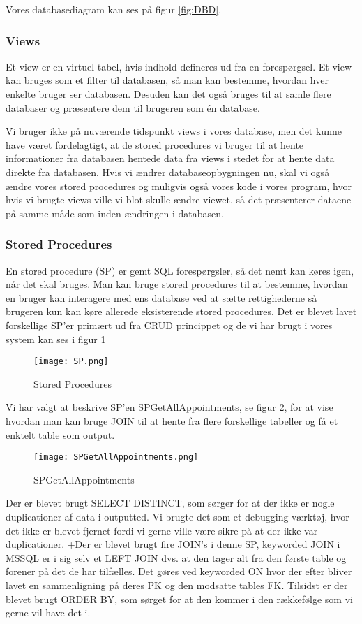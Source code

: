 Vores databasediagram kan ses på figur \ref{fig:DBD}.

\subsubsection{Views}

Et view er en virtuel tabel, hvis indhold defineres ud fra en forespørgsel.
Et view kan bruges som et filter til databasen, så man kan bestemme, hvordan hver enkelte bruger ser databasen.
Desuden kan det også bruges til at samle flere databaser og præsentere dem til brugeren som én database.

Vi bruger ikke på nuværende tidspunkt views i vores database, men det kunne have været fordelagtigt, at de stored procedures vi bruger til at hente informationer fra databasen hentede data fra views i stedet for at hente data direkte fra databasen.
Hvis vi ændrer databaseopbygningen nu, skal vi også ændre vores stored procedures og muligvis også vores kode i vores program, hvor hvis vi brugte views ville vi blot skulle ændre viewet, så det præsenterer dataene på samme måde som inden ændringen i databasen.

\subsubsection{Stored Procedures}
En stored procedure (SP) er gemt SQL forespørgsler, så det nemt kan køres igen, når det skal bruges.
Man kan bruge stored procedures til at bestemme, hvordan en bruger kan interagere med ens database ved at sætte rettighederne så brugeren kun kan køre allerede eksisterende stored procedures.
Det er blevet lavet forskellige SP'er primært ud fra CRUD princippet og de vi har brugt i vores system kan ses i figur \ref{StoredProcedures}

\begin{figure}[h]
    \caption{Stored Procedures}
    \centering
        \texttt{[image: SP.png]}
    \label{StoredProcedures}
\end{figure}

Vi har valgt at beskrive SP'en SPGetAllAppointments, se figur \ref{SPGetAllAppointments}, for at vise hvordan man kan bruge JOIN til at hente fra flere forskellige tabeller og få et enktelt table som output.

\begin{figure}[h]
    \caption{SPGetAllAppointments}
    \centering
        \texttt{[image: SPGetAllAppointments.png]}
    \label{SPGetAllAppointments}
\end{figure}

Der er blevet brugt SELECT DISTINCT, som sørger for at der ikke er nogle duplicationer af data i outputted. Vi brugte det som et debugging værktøj, hvor det ikke er blevet fjernet fordi vi gerne ville være sikre på at der ikke var duplicationer.
+Der er blevet brugt fire JOIN's i denne SP, keyworded JOIN i MSSQL er i sig selv et LEFT JOIN dvs. at den tager alt fra den første table og forener på det de har tilfælles. Det gøres ved keyworded ON hvor der efter bliver lavet en sammenligning på deres PK og den modsatte tables FK.
Tilsidst er der blevet brugt ORDER BY, som sørget for at den kommer i den rækkefølge som vi gerne vil have det i.
